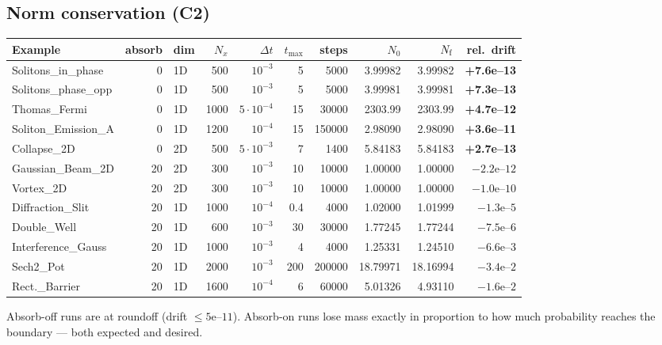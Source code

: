 \documentclass[11pt,a4paper]{article}
\begin{document}
\subsection{Norm conservation (C2)}

\begin{longtable}{@{}l r l r r r r r r r@{}}
\toprule
Example & absorb & dim & $N_x$ & $\Delta t$ & $t_{\max}$ & steps &
$N_{0}$ & $N_{\rm f}$ & rel.\ drift \\
\midrule
\endhead
Solitons\_in\_phase & 0  & 1D &  500 & $10^{-3}$ &   5 &   5000 &   3.99982 &   3.99982 & \textbf{+7.6e--13} \\
Solitons\_phase\_opp& 0  & 1D &  500 & $10^{-3}$ &   5 &   5000 &   3.99981 &   3.99981 & \textbf{+7.3e--13} \\
Thomas\_Fermi       & 0  & 1D & 1000 & $5\cdot 10^{-4}$ &  15 &  30000 &   2303.99 &   2303.99 & \textbf{+4.7e--12} \\
Soliton\_Emission\_A& 0  & 1D & 1200 & $10^{-4}$ &  15 & 150000 &   2.98090 &   2.98090 & \textbf{+3.6e--11} \\
Collapse\_2D        & 0  & 2D &  500 & $5\cdot 10^{-3}$ &   7 &   1400 &   5.84183 &   5.84183 & \textbf{+2.7e--13} \\
Gaussian\_Beam\_2D  & 20 & 2D &  300 & $10^{-3}$ &  10 &  10000 &   1.00000 &   1.00000 & $-2.2\text{e--}12$ \\
Vortex\_2D          & 20 & 2D &  300 & $10^{-3}$ &  10 &  10000 &   1.00000 &   1.00000 & $-1.0\text{e--}10$ \\
Diffraction\_Slit   & 20 & 1D & 1000 & $10^{-4}$ & 0.4 &   4000 &   1.02000 &   1.01999 & $-1.3\text{e--}5$ \\
Double\_Well        & 20 & 1D &  600 & $10^{-3}$ &  30 &  30000 &   1.77245 &   1.77244 & $-7.5\text{e--}6$ \\
Interference\_Gauss & 20 & 1D & 1000 & $10^{-3}$ &   4 &   4000 &   1.25331 &   1.24510 & $-6.6\text{e--}3$ \\
Sech2\_Pot          & 20 & 1D & 2000 & $10^{-3}$ & 200 & 200000 &  18.79971 &  18.16994 & $-3.4\text{e--}2$ \\
Rect.\_Barrier      & 20 & 1D & 1600 & $10^{-4}$ &   6 &  60000 &   5.01326 &   4.93110 & $-1.6\text{e--}2$ \\
\bottomrule
\end{longtable}

Absorb-off runs are at roundoff (drift $\le 5\text{e--}11$).
Absorb-on runs lose mass exactly in proportion to how much probability
reaches the boundary --- both expected and desired.
\end{document}
